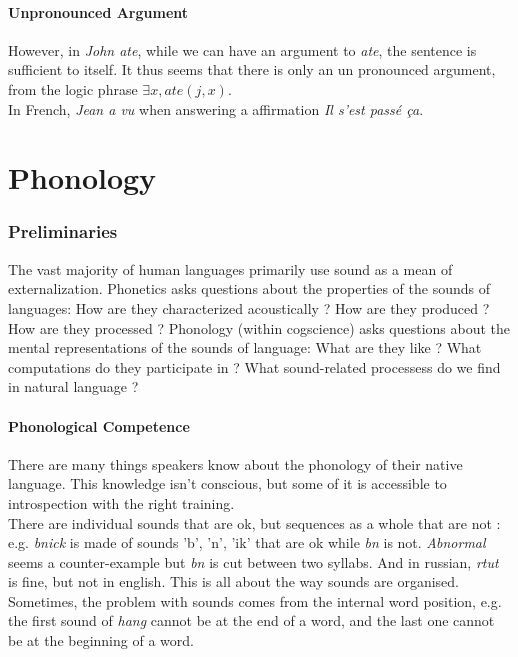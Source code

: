 \documentclass{cours}
\begin{document}
\subsection{Unpronounced Argument}
However, in \textsl{John ate}, while we can have an argument to \textsl{ate}, the sentence is sufficient to itself.
It thus seems that there is only an un pronounced argument, from the logic phrase $\exists x, ate(j, x)$. \\
In French, \textsl{Jean a vu} when answering a affirmation \textsl{Il s'est passé ça}. \\


\part[Class 7 : 23/11]{Phonology}
\section{Preliminaries}
The vast majority of human languages primarily use sound as a mean of externalization. Phonetics asks questions about the properties of the sounds of languages: How are they characterized acoustically ? How are they produced ? How are they processed ? Phonology (within cogscience) asks questions about the mental representations of the sounds of language: What are they like ? What computations do they participate in ? What sound-related processess do we find in natural language ?

\subsection{Phonological Competence}
There are many things speakers know about the phonology of their native language. This knowledge isn't conscious, but some of it is accessible to introspection with the right training.\\
There are individual sounds that are ok, but sequences as a whole that are not : e.g. \textsl{bnick} is made of sounds 'b', 'n', 'ik' that are ok while \textsl{bn} is not. \textsl{Abnormal} seems a counter-example but \textsl{bn} is cut between two syllabs. And in russian, \textsl{rtut} is fine, but not in english. This is all about the way sounds are organised. \\
Sometimes, the problem with sounds comes from the internal word position, e.g. the first sound of \textsl{hang} cannot be at the end of a word, and the last one cannot be at the beginning of a word.
\end{document}
